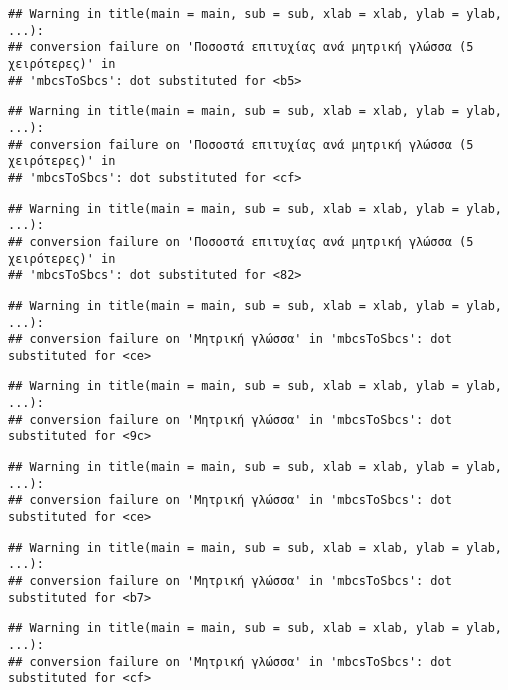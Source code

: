 \documentclass[
]{article}
\begin{document}
\begin{verbatim}
## Warning in title(main = main, sub = sub, xlab = xlab, ylab = ylab, ...):
## conversion failure on 'Ποσοστά επιτυχίας ανά μητρική γλώσσα (5 χειρότερες)' in
## 'mbcsToSbcs': dot substituted for <b5>
\end{verbatim}

\begin{verbatim}
## Warning in title(main = main, sub = sub, xlab = xlab, ylab = ylab, ...):
## conversion failure on 'Ποσοστά επιτυχίας ανά μητρική γλώσσα (5 χειρότερες)' in
## 'mbcsToSbcs': dot substituted for <cf>
\end{verbatim}

\begin{verbatim}
## Warning in title(main = main, sub = sub, xlab = xlab, ylab = ylab, ...):
## conversion failure on 'Ποσοστά επιτυχίας ανά μητρική γλώσσα (5 χειρότερες)' in
## 'mbcsToSbcs': dot substituted for <82>
\end{verbatim}

\begin{verbatim}
## Warning in title(main = main, sub = sub, xlab = xlab, ylab = ylab, ...):
## conversion failure on 'Μητρική γλώσσα' in 'mbcsToSbcs': dot substituted for <ce>
\end{verbatim}

\begin{verbatim}
## Warning in title(main = main, sub = sub, xlab = xlab, ylab = ylab, ...):
## conversion failure on 'Μητρική γλώσσα' in 'mbcsToSbcs': dot substituted for <9c>
\end{verbatim}

\begin{verbatim}
## Warning in title(main = main, sub = sub, xlab = xlab, ylab = ylab, ...):
## conversion failure on 'Μητρική γλώσσα' in 'mbcsToSbcs': dot substituted for <ce>
\end{verbatim}

\begin{verbatim}
## Warning in title(main = main, sub = sub, xlab = xlab, ylab = ylab, ...):
## conversion failure on 'Μητρική γλώσσα' in 'mbcsToSbcs': dot substituted for <b7>
\end{verbatim}

\begin{verbatim}
## Warning in title(main = main, sub = sub, xlab = xlab, ylab = ylab, ...):
## conversion failure on 'Μητρική γλώσσα' in 'mbcsToSbcs': dot substituted for <cf>
\end{verbatim}
\end{document}
